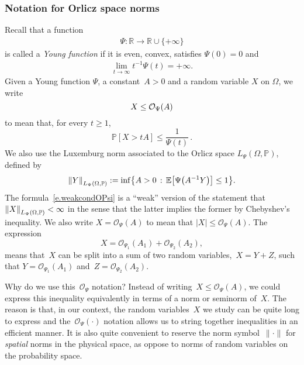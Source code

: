 \documentclass[11pt]{article} %
\numberwithin{equation}{section}
\theoremstyle{definition}
\let\originalleft\left
\let\originalright\right
\renewcommand{\left}{\mathopen{}\mathclose\bgroup\originalleft}
\renewcommand{\right}{\aftergroup\egroup\originalright}
\newcommand*{\R}{\ensuremath{\mathbb{R}}}
\renewcommand{\P}{\mathbb{P}}
\newcommand{\E}{\mathbb{E}}
\renewcommand{\O}{\mathcal{O}}
\begin{document}
\subsubsection{Notation for Orlicz space norms}
Recall that a function
\begin{align*}
\Psi: \R \to \R \cup\{+\infty\}
\end{align*}
is called a \emph{Young function} if it is even, convex, satisfies $\Psi(0)=0$ and 
\begin{align}
\label{e.Young.growth}
\lim_{t\to \infty} 
t^{-1} \Psi(t) = +\infty. 
\end{align}
Given a Young function $\Psi$, a constant~$A>0$ and a random variable $X$ on $\Omega$, we write 
\begin{equation}
X \leq \O_\Psi \left( A \right)
\end{equation}
to mean that, for every $t\geq 1$, 
\begin{equation}
\label{e.weakcondOPsi}
\P[ X > tA  ] \leq \frac1{\Psi(t)}
\, . 
\end{equation}
We also use the Luxemburg norm associated to the Orlicz space $L_\Psi(\Omega,\P)$, defined by
\begin{equation}
\label{e.Lux}
\left\| Y \right\|_{L_\Psi(\Omega,\P)}:= \inf\left\{ A>0\,:\, \E \left[ \Psi\left( A^{-1}Y \right) \right] \leq 1 \right\}.
\end{equation}
The formula~\eqref{e.weakcondOPsi} is a ``weak'' version of the statement that~$\left\| X \right\|_{L_\Psi(\Omega,\P)} <\infty$ in the sense that the latter implies the former by Chebyshev's inequality. 
We also write $X = \O_\Psi(A)$ to mean that $|X| \leq \O_\Psi(A)$. The expression
\begin{equation*}
X = \O_{\Psi_1}(A_1) + \O_{\Psi_2}(A_2), 
\end{equation*}
means that~$X$ can be split into a sum of two random variables,~$X=Y+Z$, such that $Y=\O_{\Psi_1}(A_1)$ and~$Z = \O_{\Psi_2}(A_2)$. 

\smallskip

Why do we use this~$\O_\Psi$ notation? Instead of writing~$X \leq \O_\Psi(A)$, we could express this inequality equivalently in terms of a norm or seminorm of~$X$. The reason is that, in our context, the random variables~$X$ we study can be quite long to express and the~$\O_\Psi(\cdot)$ notation allows us to string together inequalities in an efficient manner. It is also quite convenient to reserve the norm symbol~$\| \cdot \|$ for \emph{spatial} norms in the physical space, as oppose to norms of random variables on the probability space. 
\end{document}
